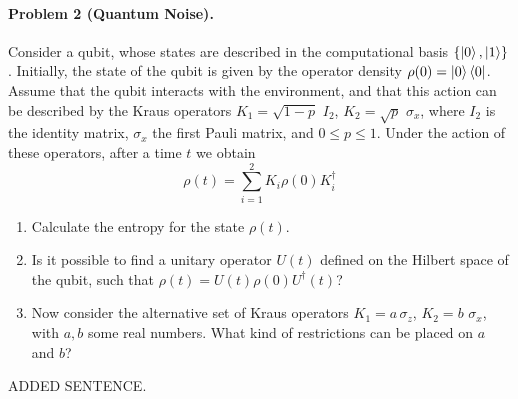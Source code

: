 \documentclass[catalan,spanish,english]{exam}
\begin{document}
\paragraph{Problem 2 (Quantum Noise).}
Consider a qubit, whose states are described in the computational
basis $\{\left|0\right\rangle,\left|1\right\rangle\}$. Initially, the state of the qubit is given
by the operator density $\rho(0)=\left|0\right\rangle\left\langle 0\right|$. Assume that the qubit
interacts with the environment, and that this action can be described
by the Kraus operators $K_{1}=\sqrt{1-p}\,\,I_{2}$, $K_{2}=\sqrt{p}\,\,\sigma_{x}$,
where $I_{2}$ is the identity matrix, $\sigma_{x}$ the first Pauli
matrix, and $0\le p\le1$. Under the action of these operators, after
a time $t$ we obtain\foreignlanguage{spanish}{
\[
\rho(t)=\sum_{i=1}^{2}K_{i}\rho(0)K_{i}^{\dagger}
\]
}

\begin{enumerate}
    \item Calculate the entropy for the state $\rho(t)$. 
    \item Is it possible to
find a unitary operator $U(t)$ defined on the Hilbert space of the
qubit, such that $\rho(t)=U(t)\rho(0)U^{\dagger}(t)$? 

\item Now consider the alternative set of Kraus operators $K_{1}=a\,\sigma_{z}$,
$K_{2}=b\,\,\sigma_{x}$, with $a,b$ some real numbers. What kind
of restrictions can be placed on $a$ and $b$?
\end{enumerate}

ADDED SENTENCE.


\cite{skotiniotisQuantumMetrologyIsing2015}
\end{document}
